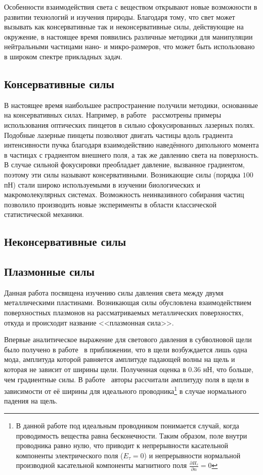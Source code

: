 \intro

  Особенности взаимодействия света с веществом открывают новые возможности в развитии технологий и изучения природы. Благодаря тому, что свет может вызывать как консервативные так и неконсервативные силы, действующие на окружение, в настоящее время появились различные методики для манипуляции нейтральными частицами нано- и микро-размеров, что может быть использовано в широком спектре прикладных задач. 

\subsection{Консервативные силы}  
В настоящее время наибольшее распространение получили методики, основанные на консервативных силах. Например, в работе~\cite{grier2003revolution} рассмотрены примеры использования оптических пинцетов в сильно сфокусированных лазерных полях. 
Подобные лазерные пинцеты позволяют двигать частицы вдоль градиента интенсивности пучка благодаря взаимодействию наведённого дипольного момента в частицах с градиентом внешнего поля, а так же давлению света на поверхность. В случае сильной фокусировки преобладает давление, вызванное градиентом, поэтому эти силы называют консервативными. Возникающие силы (порядка $100$ пН) стали широко используемыми в изучении биологических и макромолекулярных системах. Возможность неинвазивного собирания частиц позволило производить новые эксперименты в области классической статистической механики. 

\subsection{Неконсервативные силы}


\subsection{Плазмонные силы}
Данная работа посвящена изучению силы давления света между двумя металлическими пластинами. Возникающая силы обусловлена взаимодействием поверхностных плазмонов на рассматриваемых металлических поверхностях, откуда и происходит название <<плазмонная сила>>. 

Впервые аналитическое выражение для светового давления в субволновой щели было получено в работе~\cite{Frumin11} в приближении, что в щели возбуждается лишь одна мода, амплитуда которой равняется амплитуде падающей волны на щель и которая не зависит от ширины щели. Полученная оценка в $0.36$ нН, что больше, чем градиентные силы.  В работе~\cite{Shapiro16}
авторы рассчитали амплитуду поля в щели в зависимости от её ширины для идеального проводника\footnote{В данной работе под идеальным проводником 
понимается случай, когда проводимость вещества равна бесконечности. Таким образом, поле внутри проводника равно нулю, что приводит к непрерывности касательной компоненты электрического поля ($E_{\tau} = 0$) и непрерывности нормальной производной касательной компоненты магнитного поля 
$\frac{\partial H_{\tau}}{\partial n} = 0$} в случае нормального падения на щель. 

